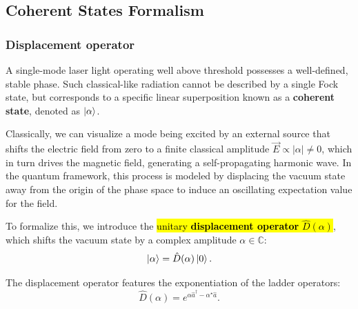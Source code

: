 
\subsection{Coherent States Formalism}

\subsubsection{Displacement operator}

A single-mode laser light operating well above threshold possesses a well-defined, stable phase. Such classical-like radiation cannot be described by a single Fock state, but corresponds to a specific linear superposition known as a \textbf{coherent state}, denoted as $\ket{\alpha}$.

Classically, we can visualize a mode being excited by an external source that shifts the electric field from zero to a finite classical amplitude $\vec{E} \propto |\alpha| \neq 0$, which in turn drives the magnetic field, generating a self-propagating harmonic wave. In the quantum framework, this process is modeled by displacing the vacuum state away from the origin of the phase space to induce an oscillating expectation value for the field.

To formalize this, we introduce the \hl{unitary \textbf{displacement operator} $\hat{D}(\alpha)$}, which shifts the vacuum state by a complex amplitude $\alpha \in \mathbb{C}$:
\begin{equation}\label{eqn:13-displacement-operator-definition}
\ket{\alpha} = \hat{D}(\alpha) \ket{0}.
\end{equation}

The displacement operator features the exponentiation of the ladder operators:
\begin{equation}\label{eqn:13-displacement-operator-exponential}
\hat{D}(\alpha) = e^{\alpha \hat{a}^\dagger  - \alpha^\star \hat{a}}.
\end{equation}

